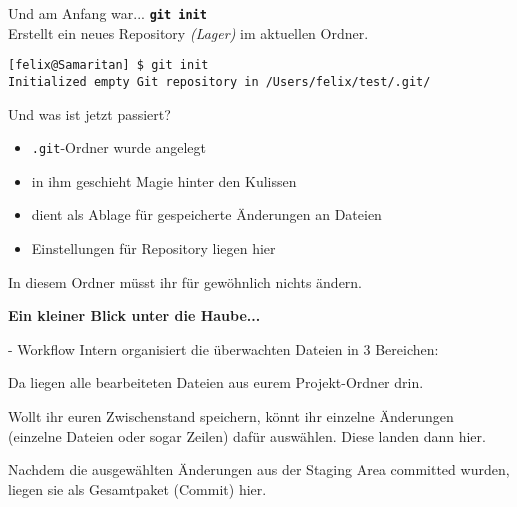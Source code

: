 
\begin{frame}[fragile]{Und am Anfang war... }
	\centering \Large \textbf{\texttt{\alert{git init}}}\\[.2cm]
	\normalsize Erstellt ein neues Repository \emph{(Lager)} im aktuellen Ordner.
	\pause{}

	\vfill
	\begin{lstlisting}
[felix@Samaritan] $ git init
Initialized empty Git repository in /Users/felix/test/.git/
\end{lstlisting}

\end{frame}

\begin{frame}{Und was ist jetzt passiert?}
	\begin{itemize}
		\item \texttt{.git}-Ordner wurde angelegt
		\item in ihm geschieht \glqq{}Magie\grqq{} hinter den Kulissen
		\item dient als Ablage für gespeicherte Änderungen an Dateien
		\item Einstellungen für Repository liegen hier
	\end{itemize}

	In diesem Ordner müsst ihr für gewöhnlich nichts ändern.
\end{frame}

\begin{frame}
	\centering \Large \textbf{Ein kleiner Blick unter die Haube...}
\end{frame}

\begin{frame}{\git - Workflow}
	Intern organisiert \git die überwachten Dateien in 3 Bereichen:
	
	\begin{description}
		\item [Working Directory] Da liegen alle bearbeiteten Dateien aus eurem Projekt-Ordner drin.
		\item [Staging Area] Wollt ihr euren Zwischenstand speichern, könnt ihr einzelne Änderungen (einzelne Dateien oder sogar Zeilen) dafür auswählen. Diese landen dann hier.
		\item [Repository] Nachdem die ausgewählten Änderungen aus der Staging Area committed wurden, liegen sie als Gesamtpaket (Commit) hier.
	\end{description}
\end{frame}

